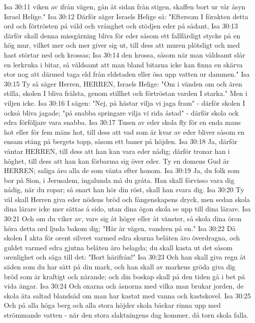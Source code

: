 Isa 30:11  viken av ifrån vägen, gån åt sidan från stigen, skaffen bort ur vår åsyn Israel Helige."
Isa 30:12  Därför säger Israels Helige så: "Eftersom I förakten detta ord och förtrösten på våld och vrånghet och stödjen eder på sådant,
Isa 30:13  därför skall denna missgärning bliva för eder såsom ett fallfärdigt stycke på en hög mur, vilket mer och mer giver sig ut, till dess att muren plötsligt och med hast störtar ned och krossas;
Isa 30:14  den krossa, såsom när man våldsamt slår en lerkruka i bitar, så våldsamt att man bland bitarna icke kan finna en skärva stor nog att därmed taga eld från eldstaden eller ösa upp vatten ur dammen."
Isa 30:15  Ty så säger Herren, HERREN, Israels Helige: "Om i vänden om och ären stilla, skolen I bliva frälsta, genom stillhet och förtröstan varden I starka." Men i viljen icke.
Isa 30:16  I sägen: "Nej, på hästar vilja vi jaga fram" - därför skolen I också bliva jagade; "på snabba springare vilja vi rida åstad" - därför skola ock edra förföljare vara snabba.
Isa 30:17  Tusen av eder skola fly för en enda mans hot eller för fem mäns hot, till dess att vad som är kvar av eder bliver såsom en ensam stång på bergets topp, såsom ett baner på höjden.
Isa 30:18  Ja, därför väntar HERREN, till dess att han kan vara eder nådig; därför tronar han i höghet, till dess att han kan förbarma sig över eder. Ty en domens Gud är HERREN; saliga äro alla de som vänta efter honom.
Isa 30:19  Ja, du folk som bor på Sion, i Jerusalem, ingalunda må du gråta. Han skall förvisso vara dig nådig, när du ropar; så snart han hör din röst, skall han svara dig.
Isa 30:20  Ty väl skall Herren giva eder nödens bröd och fångenskapens dryck, men sedan skola dina lärare icke mer sättas å sido, utan dina ögon skola se upp till dina lärare.
Isa 30:21  Och om du viker av, vare sig åt höger eller åt vänster, så skola dina öron höra detta ord ljuda bakom dig; "Här är vägen, vandren på en."
Isa 30:22  Då skolen I akta för orent silvret varmed edra skurna beläten äro överdragna, och guldet varmed edra gjutna beläten äro belagda; du skall kasta ut det såsom orenlighet och säga till det: "Bort härifrån!"
Isa 30:23  Och han skall giva regn åt säden som du har sått på din mark, och han skall av markens gröda giva dig bröd som är kraftigt och närande; och din boskap skall på den tiden gå i bet på vida ängar.
Isa 30:24  Och oxarna och åsnorna med vilka man brukar jorden, de skola äta saltad blandsäd om man har kastat med vanna och kastskovel.
Isa 30:25  Och på alla höga berg och alla stora höjder skola bäckar rinna upp med strömmande vatten - när den stora slaktningens dag kommer, då torn skola falla.
